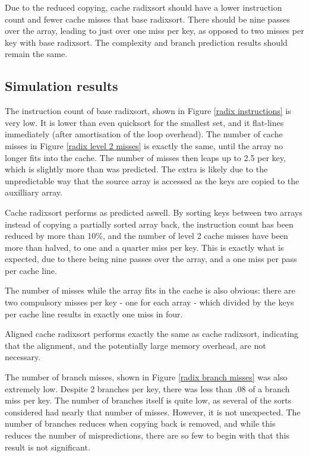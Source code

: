 Due to the reduced copying, cache radixsort should have a lower instruction
count and fewer cache misses that base radixsort. There should be nine passes
over the array, leading to just over one miss per key, as opposed to two misses
per key with base radixsort. The complexity and branch prediction results
should remain the same.

\subsection{Simulation results}

The instruction count of base radixsort, shown in Figure \ref{radix instructions} is
very low. It is lower than even quicksort for the smallest set, and it
flat-lines immediately (after amortisation of the loop overhead). The number of
cache misses in Figure \ref{radix level 2 misses} is exactly the same, until
the array no longer fits into the cache. The number of misses then leaps up to
2.5 per key, which is slightly more than was predicted. The extra is likely due
to the unpredictable way that the source array is accessed as the keys are
copied to the auxilliary array.

Cache radixsort performs as predicted aswell. By sorting keys between two
arrays instead of copying a partially sorted array back, the instruction count
has been reduced by more than 10\%, and the number of level 2 cache misses
have been more than halved, to one and a quarter miss per key. This is exactly
what is expected, due to there being nine passes over the array, and a one miss
per pass per cache line.

The number of misses while the array fits in the cache is also obvious: there
are two compulsory misses per key - one for each array - which divided by the
keys per cache line results in exactly one miss in four.

Aligned cache radixsort performs exactly the same as cache radixsort, indicating
that the alignment, and the potentially large memory overhead, are not
necessary.

The number of branch misses, shown in Figure \ref{radix branch misses} was also
extremely low. Despite 2 branches per key, there was less than .08 of a branch
miss per key. The number of branches itself is quite low, as several of the
sorts considered had nearly that number of misses. However, it is not
unexpected. The number of branches reduces when copying back is removed, and
while this reduces the number of mispredictions, there are so few to begin with
that this result is not significant.

